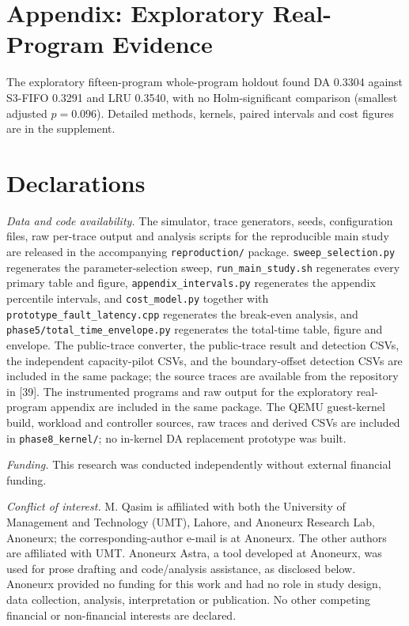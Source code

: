\documentclass[10pt,twocolumn,a4paper]{IEEEtran}
\begin{document}
\section*{Appendix: Exploratory Real-Program Evidence}

The exploratory fifteen-program whole-program holdout found DA 0.3304 against
S3-FIFO 0.3291 and LRU 0.3540, with no Holm-significant comparison (smallest
adjusted $p=0.096$). Detailed methods, kernels, paired intervals and cost
figures are in the supplement.

\section*{Declarations}

\emph{Data and code availability.} The simulator, trace generators, seeds,
configuration files, raw per-trace output and analysis scripts for the
reproducible main study are released in the accompanying
\texttt{reproduction/} package. \texttt{sweep\_selection.py} regenerates the
parameter-selection sweep, \texttt{run\_main\_study.sh} regenerates every
primary table and figure, \texttt{appendix\_intervals.py} regenerates the
appendix percentile intervals, and \texttt{cost\_model.py} together with
\texttt{prototype\_fault\_latency.cpp} regenerates the break-even analysis, and
\texttt{phase5/total\_time\_envelope.py} regenerates the total-time table,
figure and envelope.
The public-trace converter, the public-trace result and detection CSVs, the
independent capacity-pilot CSVs, and the boundary-offset detection CSVs are included in the
same package; the source traces are available from the repository in [39].
The instrumented programs and raw output for the exploratory real-program
appendix are included in the same package. The QEMU guest-kernel build,
workload and controller sources, raw traces and derived CSVs are included in
\texttt{phase8\_kernel/}; no in-kernel DA replacement prototype was built.

\emph{Funding.} This research was conducted independently without external
financial funding.

\emph{Conflict of interest.} M. Qasim is affiliated with both the University of
Management and Technology (UMT), Lahore, and Anoneurx Research Lab, Anoneurx;
the corresponding-author e-mail is at Anoneurx. The other authors are
affiliated with UMT. Anoneurx Astra, a tool developed at Anoneurx, was used for
prose drafting and code/analysis assistance, as disclosed below. Anoneurx
provided no funding for this work and had no role in study design, data
collection, analysis, interpretation or publication. No other competing
financial or non-financial interests are declared.
\end{document}
